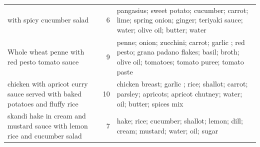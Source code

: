 \begin{table}[ht]
\begin{tabular}{lrl}
with spicy cucumber salad &   6 &  pangasius;  sweet potato;  cucumber;  carrot;  lime;  spring onion; ginger; teriyaki sauce; water;  olive oil;  butter; water \\ 
  Whole wheat penne with red pesto tomato sauce &   9 &  penne; onion;  zucchini;  carrot;  garlic ;  red pesto; grana padano flakes; basil; broth;  olive oil; tomatoes; tomato puree; tomato paste \\ 
  chicken with apricot curry sauce served with baked potatoes and fluffy rice &  10 &  chicken breast;  garlic ;  rice;  shallot;  carrot; parsley; apricots;  apricot chutney; water;   oil;  butter;  spices mix \\ 
  skandi hake in cream and mustard sauce with lemon rice and cucumber salad &   7 &  hake;  rice;  cucumber;  shallot; lemon; dill;  cream; mustard; water;  oil;  sugar \\ 
   \hline
\end{tabular}
\end{table}
